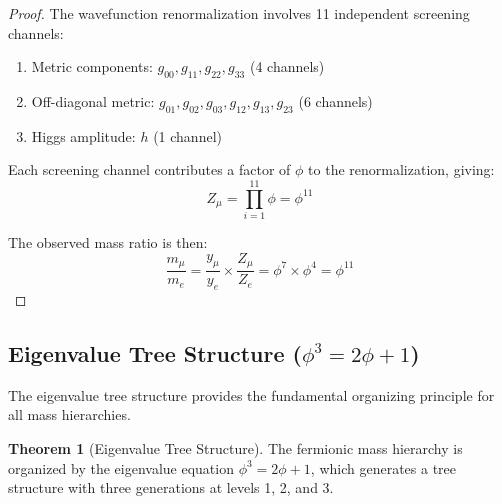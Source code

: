 \documentclass[11pt]{article}
\theoremstyle{definition}
\newtheorem{theorem}{Theorem}[section]
\newcommand{\goldenratio}{\phi}
\begin{document}
\begin{proof}
The wavefunction renormalization involves 11 independent screening channels:
\begin{enumerate}
\item Metric components: $g_{00}, g_{11}, g_{22}, g_{33}$ (4 channels)
\item Off-diagonal metric: $g_{01}, g_{02}, g_{03}, g_{12}, g_{13}, g_{23}$ (6 channels)
\item Higgs amplitude: $h$ (1 channel)
\end{enumerate}

Each screening channel contributes a factor of $\goldenratio$ to the renormalization, giving:
\begin{equation}
Z_\mu = \prod_{i=1}^{11} \goldenratio = \goldenratio^{11}
\end{equation}

The observed mass ratio is then:
\begin{equation}
\frac{m_\mu}{m_e} = \frac{y_\mu}{y_e} \times \frac{Z_\mu}{Z_e} = \goldenratio^7 \times \goldenratio^4 = \goldenratio^{11}
\end{equation}
\end{proof}

\subsection{Eigenvalue Tree Structure ($\goldenratio^3 = 2\goldenratio + 1$)}

The eigenvalue tree structure provides the fundamental organizing principle for all mass hierarchies.

\begin{theorem}[Eigenvalue Tree Structure]
The fermionic mass hierarchy is organized by the eigenvalue equation $\goldenratio^3 = 2\goldenratio + 1$, which generates a tree structure with three generations at levels 1, 2, and 3.
\end{theorem}
\end{document}
